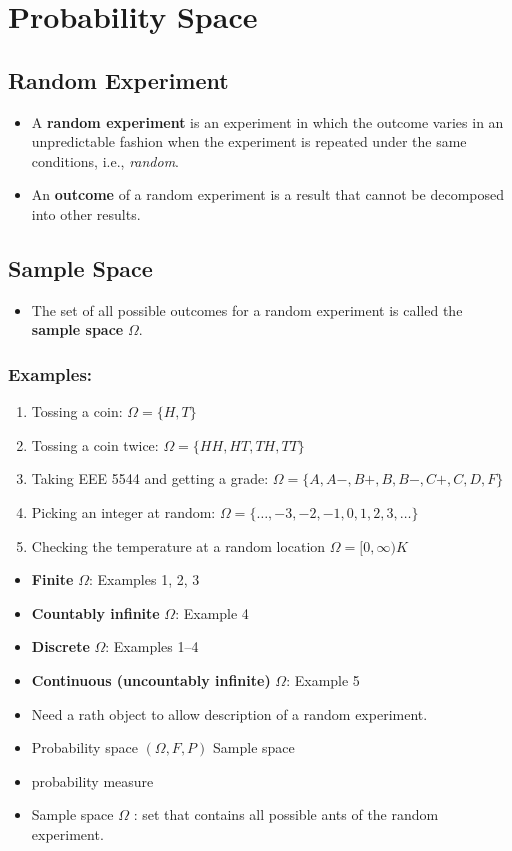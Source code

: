 \section{Probability Space}

\subsection{Random Experiment}
\begin{itemize}
\item A \textbf{random experiment} is an experiment in which the
outcome varies in an unpredictable fashion when the experiment is
repeated under the same conditions, i.e., \emph{random}.
\item An \textbf{outcome} of a random experiment is a result that
cannot be decomposed into other results.
\end{itemize}

\subsection{Sample Space}
\begin{itemize}
\item The set of all possible outcomes for a random experiment is
called the \textbf{sample space} \(\Omega\).
\end{itemize}

\subsubsection{Examples:}
\begin{enumerate}
\item Tossing a coin: \(\Omega=\{H, T\}\)
\item Tossing a coin twice: \(\Omega=\{H H, H T, T H, T T\}\)
\item Taking EEE 5544 and getting a grade:
\(
\Omega=\{A, A-, B+, B, B-, C+, C, D, F\}
\)
\item Picking an integer at random:
\(\Omega=\{\ldots,-3,-2,-1,0,1,2,3, \ldots \}\)
\item Checking the temperature at a random location
\(
\Omega=[0, \infty) K
\)
\end{enumerate}

\begin{itemize}
\item \textbf{Finite} \(\Omega\): Examples 1, 2, 3
\item \textbf{Countably infinite} \(\Omega\): Example 4
\item \textbf{Discrete} \(\Omega\):  Examples 1--4
\item \textbf{Continuous (uncountably infinite)} \(\Omega\):  Example
5
\end{itemize}



\begin{itemize}
  \item[-] Need a rath object to allow description of a random experiment.
  \item[-] Probability space \((\Omega, F, P)\) Sample space
  \item[] probability measure
  \item[-] Sample space \(\Omega\) : set that contains all possible ants of the random experiment.
\end{itemize}

